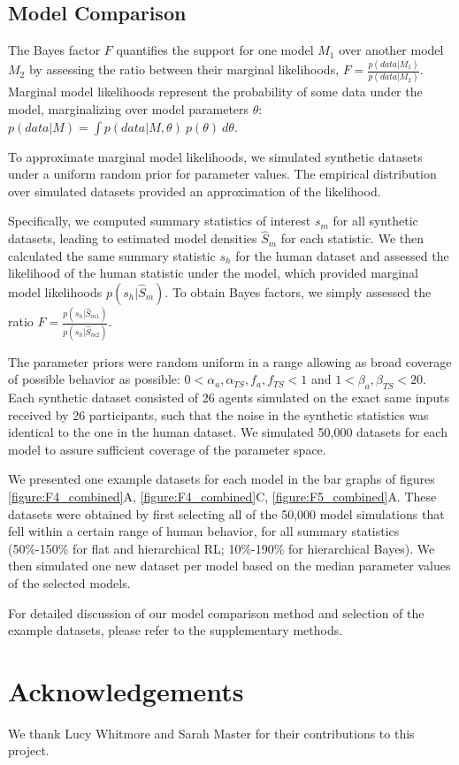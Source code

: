 \documentclass[10pt,letterpaper]{article}  %
\newcommand{\rev}{\color{black}}
\begin{document}
\subsection*{Model Comparison}

{\rev The Bayes factor $F$ quantifies the support for one model $M_1$ over another model $M_2$ by assessing the ratio between their marginal likelihoods, $F = \frac{p(data|M_1)}{p(data|M_2)}$.
Marginal model likelihoods represent the probability of some data under the model, marginalizing over model parameters $\theta$: $p(data|M) = \int p(data|M, \theta) \ p(\theta) \ d\theta$.

To approximate marginal model likelihoods, we simulated synthetic datasets under a uniform random prior for parameter values. The empirical distribution over simulated datasets provided an approximation of the likelihood.%

Specifically, we computed summary statistics of interest $s_m$ for all synthetic datasets, leading to estimated model densities $\hat{S}_m$ for each statistic. We then calculated the same summary statistic $s_h$ for the human dataset and assessed the likelihood of the human statistic under the model, which provided marginal model likelihoods $p(s_h|\hat{S}_m)$. To obtain Bayes factors, we simply assessed the ratio $F = \frac{p(s_h|\hat{S}_{m1})}{p(s_h|\hat{S}_{m2})}$.

The parameter priors were random uniform in a range allowing as broad coverage of possible behavior as possible: $0 < \alpha_{a}, \alpha_{TS}, f_{a}, f_{TS} < 1$ and $1 < \beta_{a}, \beta_{TS} < 20$.
Each synthetic dataset consisted of 26 agents simulated on the exact same inputs received by 26 participants, such that the noise in the synthetic statistics was identical to the one in the human dataset. We simulated 50,000 datasets for each model to assure sufficient coverage of the parameter space.

We presented one example datasets for each model in the bar graphs of figures \ref{figure:F4_combined}A, \ref{figure:F4_combined}C, \ref{figure:F5_combined}A. These datasets were obtained by first selecting all of the 50,000 model simulations that fell within a certain range of human behavior, for all summary statistics (50\%-150\% for flat and hierarchical RL; 10\%-190\% for hierarchical Bayes). We then simulated one new dataset per model based on the median parameter values of the selected models.

For detailed discussion of our model comparison method and selection of the example datasets, please refer to the supplementary methods.}

\section*{Acknowledgements}
We thank Lucy Whitmore and Sarah Master for their contributions to this project. 



\end{document}
